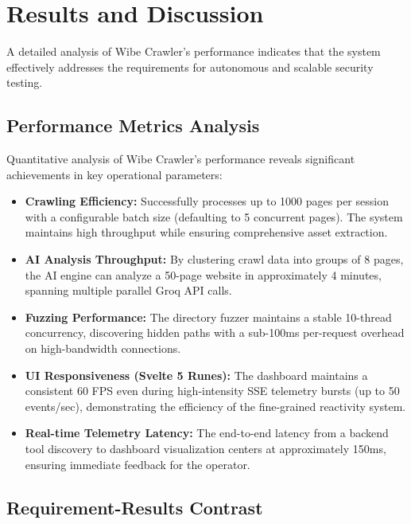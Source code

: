 \documentclass[12pt,oneside,a4paper]{book}
\begin{document}
\section{Results and Discussion}

A detailed analysis of Wibe Crawler's performance indicates that the system effectively addresses the requirements for autonomous and scalable security testing.

\subsection{Performance Metrics Analysis}

Quantitative analysis of Wibe Crawler's performance reveals significant achievements in key operational parameters:

\begin{itemize}
  \item \textbf{Crawling Efficiency:} Successfully processes up to 1000 pages per session with a configurable batch size (defaulting to 5 concurrent pages). The system maintains high throughput while ensuring comprehensive asset extraction.
  
  \item \textbf{AI Analysis Throughput:} By clustering crawl data into groups of 8 pages, the AI engine can analyze a 50-page website in approximately 4 minutes, spanning multiple parallel Groq API calls.
  
  \item \textbf{Fuzzing Performance:} The directory fuzzer maintains a stable 10-thread concurrency, discovering hidden paths with a sub-100ms per-request overhead on high-bandwidth connections.
  
  \item \textbf{UI Responsiveness (Svelte 5 Runes):} The dashboard maintains a consistent 60 FPS even during high-intensity SSE telemetry bursts (up to 50 events/sec), demonstrating the efficiency of the fine-grained reactivity system.
  
  \item \textbf{Real-time Telemetry Latency:} The end-to-end latency from a backend tool discovery to dashboard visualization centers at approximately 150ms, ensuring immediate feedback for the operator.
\end{itemize}

\subsection{Requirement-Results Contrast}
\end{document}
